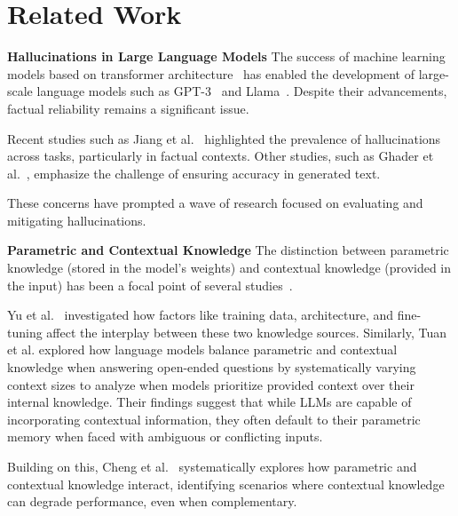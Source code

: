 \section{Related Work}
\label{related_work}



\textbf{Hallucinations in Large Language Models}
The success of machine learning models based on transformer architecture~\cite{attention_is_all_you_need} has enabled the development of large-scale language models such as GPT-3~\cite{gpt3} and Llama~\cite{llama}.
Despite their advancements, factual reliability remains a significant issue.

Recent studies such as Jiang et al.~\cite{how_can_we_know} highlighted the prevalence of hallucinations across tasks, particularly in factual contexts.
Other studies, such as Ghader et al.~\cite{can_rag_models_reason}, emphasize the challenge of ensuring accuracy in generated text.

These concerns have prompted a wave of research focused on evaluating and mitigating hallucinations.

\textbf{Parametric and Contextual Knowledge} 
The distinction between parametric knowledge (stored in the model's weights) and contextual knowledge (provided in the input) has been a focal point of several studies~\cite{knowledge}.

Yu et al.~\cite{factual_recall} investigated how factors like training data, architecture, and fine-tuning affect the interplay between these two knowledge sources.
Similarly, Tuan et al.\cite{when_context_leads} explored how language models balance parametric and contextual knowledge when answering open-ended questions by systematically varying context sizes to analyze when models prioritize provided context over their internal knowledge.
Their findings suggest that while LLMs are capable of incorporating contextual information, they often default to their parametric memory when faced with ambiguous or conflicting inputs.

Building on this, Cheng et al.~\cite{understanding_the_interplay} systematically explores how parametric and contextual knowledge interact, identifying scenarios where contextual knowledge can degrade performance, even when complementary.

